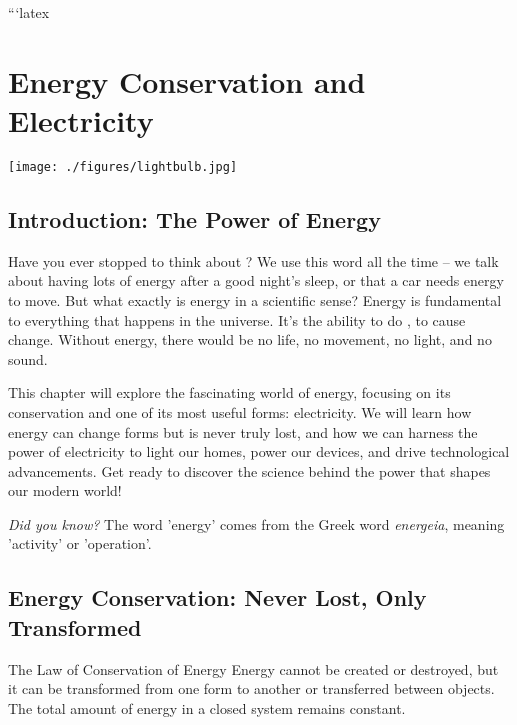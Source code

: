 ```latex
\chapter{Energy Conservation and Electricity}

\begin{marginfigure}
\texttt{[image: ./figures/lightbulb.jpg]}
\caption*{\textit{Energy powers our world. From the simple lightbulb to complex technologies, understanding energy and electricity is crucial in the 21st century.}}
\label{fig:lightbulb}
\end{marginfigure}

\section{Introduction: The Power of Energy}

Have you ever stopped to think about ? We use this word all the time – we talk about having lots of energy after a good night's sleep, or that a car needs energy to move. But what exactly is energy in a scientific sense?  Energy is fundamental to everything that happens in the universe. It's the ability to do , to cause change.  Without energy, there would be no life, no movement, no light, and no sound.

This chapter will explore the fascinating world of energy, focusing on its conservation and one of its most useful forms: electricity. We will learn how energy can change forms but is never truly lost, and how we can harness the power of electricity to light our homes, power our devices, and drive technological advancements. Get ready to discover the science behind the power that shapes our modern world!

\begin{marginnote}
\textit{Did you know?} The word 'energy' comes from the Greek word \textit{energeia}, meaning 'activity' or 'operation'.
\end{marginnote}

\section{Energy Conservation: Never Lost, Only Transformed}

\begin{keyconcept}{The Law of Conservation of Energy}
Energy cannot be created or destroyed, but it can be transformed from one form to another or transferred between objects. The total amount of energy in a closed system remains constant.
\end{keyconcept}

